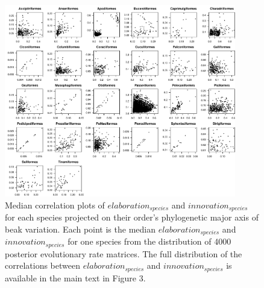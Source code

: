 \documentclass[12pt,a4paper]{article}
\begin{document}
\newpage

\begin{figure}[H]
\centering
   \includegraphics[width=0.9\textwidth]{Figures/correlations_2.pdf}
\caption{Median correlation plots of $elaboration_{species}$ and $innovation_{species}$ for each species projected on their order's phylogenetic major axis of beak variation. Each point is the median $elaboration_{species}$ and $innovation_{species}$ for one species from the distribution of 4000 posterior evolutionary rate matrices. The full distribution of the correlations between $elaboration_{species}$ and $innovation_{species}$ is available in the main text in Figure 3.}
\label{Fig:figure_correlations2}
\end{figure}

\newpage
\end{document}

